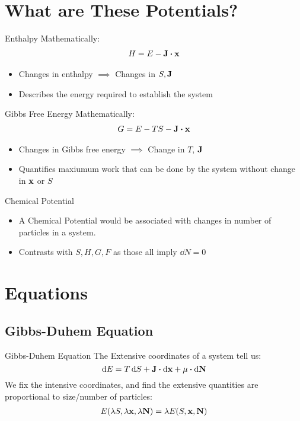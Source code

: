 \documentclass{beamer}
\begin{document}
\section{What are These Potentials?}
\begin{frame}{Enthalpy}
  Mathematically:
  \begin{align*}
    H=E-\vb{J\vdot x}
  \end{align*}
  \begin{itemize}
  \item Changes in enthalpy $\implies$ Changes in $S,\vb{J}$
  \item Describes the energy required to establish the system
  \end{itemize}
\end{frame}

\begin{frame}{Gibbs Free Energy}
  Mathematically:
  \begin{align*}
    G = E-TS - \vb{J\vdot x}
  \end{align*}
  \begin{itemize}
  \item Changes in Gibbs free energy $\implies$ Change in $T$, $\vb{J}$
  \item Quantifies maxiumum work that can be done by the system without change in $\vb{x}$ or $S$
  \end{itemize}
\end{frame}

\begin{frame}{Chemical Potential}
  \begin{itemize}
  \item A Chemical Potential would be associated with changes in number of particles in a system.
  \item Contrasts with $S,H,G,F$ as those all imply $\dd{N}=0$
  \end{itemize}
\end{frame}

\section{Equations}
\subsection{Gibbs-Duhem Equation}
\begin{frame}{Gibbs-Duhem Equation}
  The Extensive coordinates of a system tell us:
  \begin{equation}\label{eq:1}
    \dd{E}=T\dd{S}+\vb{J\vdot\dd{x}}+\mu\vdot\dd{\vb{N}}
  \end{equation}
  We fix the intensive coordinates, and find the extensive quantities are proportional to size/number of particles:
  \begin{align*}
    E(\lambda S,\lambda\vb{x},\lambda\vb{N})=\lambda E(S,\vb{x},\vb{N})
  \end{align*}
\end{frame}
\end{document}
